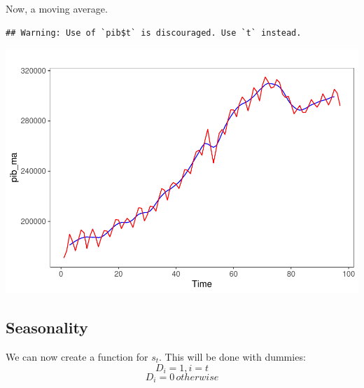\documentclass[]{article}
\newenvironment{Shaded}{\begin{snugshade}}{\end{snugshade}}
\newcommand{\DataTypeTok}[1]{\textcolor[rgb]{0.13,0.29,0.53}{#1}}
\newcommand{\DecValTok}[1]{\textcolor[rgb]{0.00,0.00,0.81}{#1}}
\newcommand{\KeywordTok}[1]{\textcolor[rgb]{0.13,0.29,0.53}{\textbf{#1}}}
\newcommand{\NormalTok}[1]{#1}
\newcommand{\OperatorTok}[1]{\textcolor[rgb]{0.81,0.36,0.00}{\textbf{#1}}}
\newcommand{\StringTok}[1]{\textcolor[rgb]{0.31,0.60,0.02}{#1}}
\begin{document}
Now, a moving average.

\begin{Shaded}
\end{Shaded}

\begin{verbatim}
## Warning: Use of `pib$t` is discouraged. Use `t` instead.
\end{verbatim}

\includegraphics{Econo2_P5_files/figure-latex/moving average-1.pdf}

\subsection{Seasonality}

We can now create a function for \(s_t\). This will be done with
dummies: \[ D_i = 1, i = t \] \[ D_i = 0 \, otherwise\]
\end{document}
